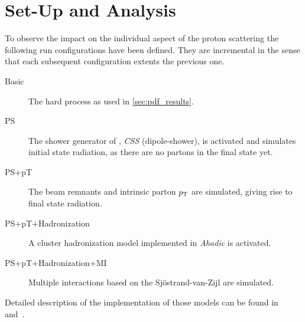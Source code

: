 \section{Set-Up and Analysis}%
\label{sec:setupan}

To observe the impact on the individual aspect of the proton
scattering the following run configurations have been defined. They
are incremental in the sense that each subsequent configuration
extents the previous one.

\begin{description}
\item[Basic] The hard process as used in \cref{sec:pdf_results}.
\item[PS] The shower generator of \sherpa, \emph{CSS} (dipole-shower),
  is activated and simulates initial state radiation, as there are no
  partons in the final state yet.
\item[PS+pT] The beam remnants and intrinsic parton
  \(p_\mathrm{T}\) are simulated, giving rise to final state radiation.
\item[PS+pT+Hadronization] A cluster hadronization model
  implemented in \emph{Ahadic} is activated.
\item[PS+pT+Hadronization+MI] Multiple interactions based on the
  Sj\"ostrand-van-Zijl are simulated.
\end{description}

Detailed description of the implementation of those models can be
found in~\cite{Gleisberg:2008ta} and~\cite{Bothmann:2019yzt}.
